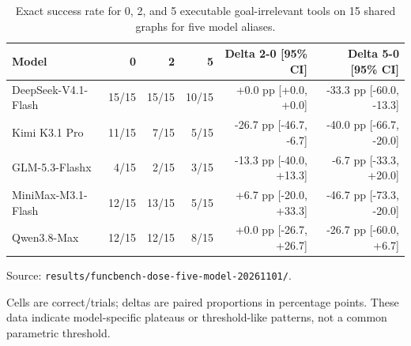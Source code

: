 \begin{table}[htbp]
\centering
\caption{Exact success rate for 0, 2, and 5 executable goal-irrelevant tools on 15 shared graphs for five model aliases.}
\label{tab:dose}
\footnotesize
\setlength{\tabcolsep}{3pt}
\renewcommand{\arraystretch}{1.08}
\begin{tabularx}{\textwidth}{>{\raggedright\arraybackslash}Xrrrrr}
\toprule
Model & 0 & 2 & 5 & Delta 2-0 [95\% CI] & Delta 5-0 [95\% CI] \\
\midrule
DeepSeek-V4.1-Flash & 15/15 & 15/15 & 10/15 & +0.0 pp [+0.0, +0.0] & -33.3 pp [-60.0, -13.3] \\
Kimi K3.1 Pro & 11/15 & 7/15 & 5/15 & -26.7 pp [-46.7, -6.7] & -40.0 pp [-66.7, -20.0] \\
GLM-5.3-Flashx & 4/15 & 2/15 & 3/15 & -13.3 pp [-40.0, +13.3] & -6.7 pp [-33.3, +20.0] \\
MiniMax-M3.1-Flash & 12/15 & 13/15 & 5/15 & +6.7 pp [-20.0, +33.3] & -46.7 pp [-73.3, -20.0] \\
Qwen3.8-Max & 12/15 & 12/15 & 8/15 & +0.0 pp [-26.7, +26.7] & -26.7 pp [-60.0, +6.7] \\
\bottomrule
\end{tabularx}
\par\parbox{\linewidth}{\raggedright\footnotesize Source: \texttt{results/\allowbreak{}funcbench-dose-five-model-20261101/\allowbreak{}}.}
\par\parbox{\linewidth}{\raggedright\footnotesize Cells are correct/trials; deltas are paired proportions in percentage points. These data indicate model-specific plateaus or threshold-like patterns, not a common parametric threshold.}
\end{table}
